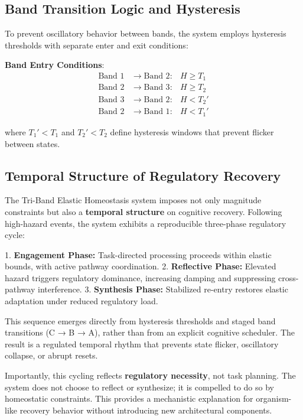 \documentclass[12pt,a4paper]{report}
\begin{document}
\subsection{Band Transition Logic and Hysteresis}

To prevent oscillatory behavior between bands, the system employs hysteresis thresholds with separate enter and exit conditions:

\textbf{Band Entry Conditions}:
\begin{align*}
\text{Band 1} &\rightarrow \text{Band 2}: & H \geq T_1 \\
\text{Band 2} &\rightarrow \text{Band 3}: & H \geq T_2 \\
\text{Band 3} &\rightarrow \text{Band 2}: & H < T_2' \\
\text{Band 2} &\rightarrow \text{Band 1}: & H < T_1'
\end{align*}

where $T_1' < T_1$ and $T_2' < T_2$ define hysteresis windows that prevent flicker between states.

\subsection{Temporal Structure of Regulatory Recovery}

The Tri-Band Elastic Homeostasis system imposes not only magnitude constraints but also a \textbf{temporal structure} on cognitive recovery. Following high-hazard events, the system exhibits a reproducible three-phase regulatory cycle:

1. \textbf{Engagement Phase:} Task-directed processing proceeds within elastic bounds, with active pathway coordination.
2. \textbf{Reflective Phase:} Elevated hazard triggers regulatory dominance, increasing damping and suppressing cross-pathway interference.
3. \textbf{Synthesis Phase:} Stabilized re-entry restores elastic adaptation under reduced regulatory load.

This sequence emerges directly from hysteresis thresholds and staged band transitions (C → B → A), rather than from an explicit cognitive scheduler. The result is a regulated temporal rhythm that prevents state flicker, oscillatory collapse, or abrupt resets.

Importantly, this cycling reflects \textbf{regulatory necessity}, not task planning. The system does not choose to reflect or synthesize; it is compelled to do so by homeostatic constraints. This provides a mechanistic explanation for organism-like recovery behavior without introducing new architectural components.
\end{document}
